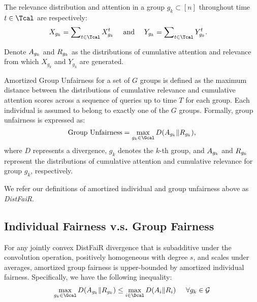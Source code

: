The relevance distribution and attention in a group $g_k \subset [n]$ throughout time $t \in \Tcal$ are respectively:
    \begin{align}
        X_{g_{k}} = \sum\nolimits_{t \in \Tcal} X_{g_{k}}^{t} & \quad \text{ and } \quad Y_{g_k} = \sum\nolimits_{t \in \Tcal} Y_{g_{k}}^{t} .
    \end{align}
    
Denote $A_{g_{k}}$ and $R_{g_{k}}$ as the distributions of cumulative attention and relevance from which $X_{g_k}$ and $Y_{g_k}$ are generated.

\begin{definition}\label{def:group-unfairness}
Amortized Group Unfairness for a set of $G$ groups is defined as the maximum distance between the distributions of cumulative relevance and cumulative attention scores across a sequence of queries up to time $T$ for each group. Each individual is assumed to belong to exactly one of the $G$ groups. Formally, group unfairness is expressed as:
\[
\text{Group Unfairness} = \max_{g_k \in \Gcal} D(\groupcummA \| \groupcummR),
\]
where $D$ represents a divergence, $g_k$ denotes the $k$-th group, and $A_{g_{k}}$ and $R_{g_{k}}$ represent the distributions of cumulative attention and cumulative relevance for group $g_k$, respectively.
\end{definition}

We refer our definitions of amortized individual and group unfairness above as \textit{DistFaiR}.

\subsection{Individual Fairness v.s. Group Fairness}


\begin{theorem}\label{theorem:indiv_group}
    For any jointly convex DistFaiR divergence that is subadditive under the convolution operation, positively homogeneous with degree $s$, and scales under averages, amortized group fairness is upper-bounded by amortized individual fairness. Specifically, we have the following inequality:
    \begin{align}
        \max_{g_k \in \Gcal}D(\groupcummA \| \groupcummR) \leq  \max_{i \in \Dcal} D(A_i \| R_i) \hspace{0.5cm} 
        \forall g_k \in \mathcal{G}
    \end{align}
\end{theorem}


